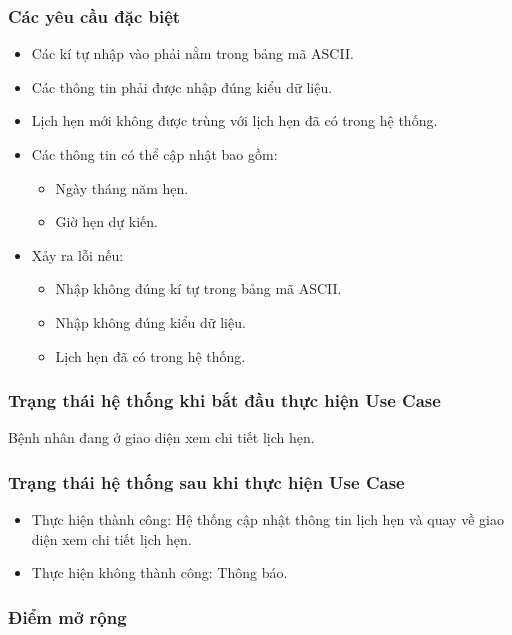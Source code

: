 \subsubsection{Các yêu cầu đặc biệt}
\begin{itemize}
  \item Các kí tự nhập vào phải nằm trong bảng mã ASCII.
  \item Các thông tin phải được nhập đúng kiểu dữ liệu.
  \item Lịch hẹn mới không được trùng với lịch hẹn đã có trong hệ thống.
  \item Các thông tin có thể cập nhật bao gồm:
    \begin{itemize}
      \item Ngày tháng năm hẹn.
      \item Giờ hẹn dự kiến.
    \end{itemize}
  \item Xảy ra lỗi nếu:
    \begin{itemize}
      \item Nhập không đúng kí tự trong bảng mã ASCII.
      \item Nhập không đúng kiểu dữ liệu.
      \item Lịch hẹn đã có trong hệ thống.
    \end{itemize}
\end{itemize}

\subsubsection{Trạng thái hệ thống khi bắt đầu thực hiện Use Case}
Bệnh nhân đang ở giao diện xem chi tiết lịch hẹn.

\subsubsection{Trạng thái hệ thống sau khi thực hiện Use Case}
\begin{itemize}
  \item Thực hiện thành công: Hệ thống cập nhật thông tin lịch hẹn và quay về giao diện xem chi tiết lịch hẹn.
  \item Thực hiện không thành công: Thông báo.
\end{itemize}

\subsubsection{Điểm mở rộng}